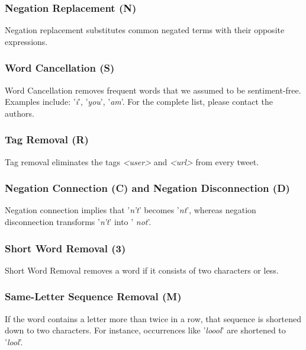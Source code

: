 \subsubsection{Negation Replacement (N)}\label{sec:method:negation-replacement}

Negation replacement substitutes common negated terms with their opposite expressions.

\subsubsection{Word Cancellation (S)}\label{sec:method:word-cancellation}

Word Cancellation removes frequent words that we assumed to be sentiment-free. Examples include: '\textit{i}', '\textit{you}', '\textit{am}'. For the complete list, please contact the authors.

\subsubsection{Tag Removal (R)}\label{sec:method:tag-removal}

Tag removal eliminates the tags \textit{\textless user\textgreater} and \textit{\textless url\textgreater} from every tweet.

\subsubsection{Negation Connection (C) and Negation Disconnection (D)}\label{sec:method:negation-connection}
Negation connection implies that '\textit{n't}' becomes '\textit{nt}', whereas negation disconnection transforms '\textit{n't}' into ' \textit{not}'.

\subsubsection{Short Word Removal (3)}\label{sec:method:short-word-removal}

Short Word Removal removes a word if it consists of two characters or less.

\subsubsection{Same-Letter Sequence Removal (M)}\label{sec:method:same-letter-removal}

If the word contains a letter more than twice in a row, that sequence is shortened down to two characters. For instance, occurrences like '\textit{loool}' are shortened to '\textit{lool}'.

